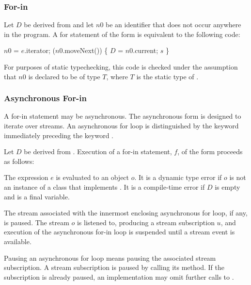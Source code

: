 \documentclass[makeidx]{article}
\begin{document}
{\subsubsection{For-in}

\LMHash{}%
Let $D$ be derived from 
and let $n0$ be an identifier that does not occur anywhere in the program.
A for statement of the form  is equivalent to the following code:

\begin{normativeDartCode}
\VAR{} $n0$ = $e$.iterator;
\WHILE{} ($n0$.moveNext()) \{
   $D$ \id{} = $n0$.current;
   $s$
\}
\end{normativeDartCode}

For purposes of static typechecking,
this code is checked under the assumption that $n0$ is declared to be of type $T$,
where $T$ is the static type of .



\subsubsection{Asynchronous For-in}

\LMHash{}%
A for-in statement may be asynchronous.
The asynchronous form is designed to iterate over streams.
An asynchronous for loop is distinguished by the keyword \AWAIT{} immediately preceding the keyword \FOR.

\LMHash{}%
Let $D$ be derived from .
Execution of a for-in statement, $f$, of the form
proceeds as follows:

\LMHash{}%
The expression $e$ is evaluated to an object $o$.
It is a dynamic type error if $o$ is not an instance of a class that implements .
It is a compile-time error if $D$ is empty and \id{} is a final variable.

\LMHash{}%
The stream associated with the innermost enclosing asynchronous for loop, if any, is paused.
The stream $o$ is listened to, producing a stream subscription $u$,
and execution of the asynchronous for-in loop is suspended
until a stream event is available.

Pausing an asynchronous for loop means pausing the associated stream subscription.
A stream subscription is paused by calling its  method.
If the subscription is already paused, an implementation may omit further calls to .

}
\end{document}
